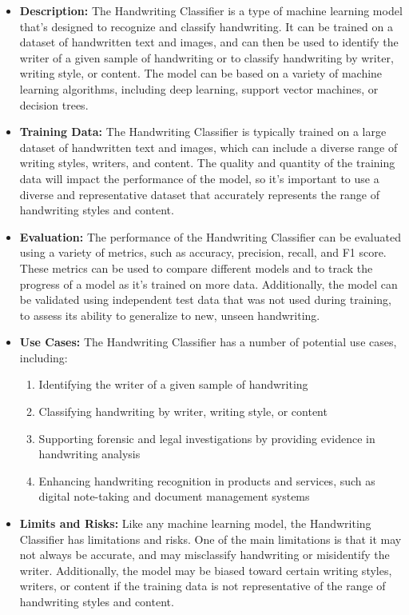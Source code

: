 \begin{itemize}
    \item \textbf{Description:} The Handwriting Classifier is a type of machine learning model that's designed to recognize and classify handwriting. It can be trained on a dataset of handwritten text and images, and can then be used to identify the writer of a given sample of handwriting or to classify handwriting by writer, writing style, or content. The model can be based on a variety of machine learning algorithms, including deep learning, support vector machines, or decision trees.
    \item \textbf{Training Data:} The Handwriting Classifier is typically trained on a large dataset of handwritten text and images, which can include a diverse range of writing styles, writers, and content. The quality and quantity of the training data will impact the performance of the model, so it's important to use a diverse and representative dataset that accurately represents the range of handwriting styles and content.
    \item \textbf{Evaluation:} The performance of the Handwriting Classifier can be evaluated using a variety of metrics, such as accuracy, precision, recall, and F1 score. These metrics can be used to compare different models and to track the progress of a model as it's trained on more data. Additionally, the model can be validated using independent test data that was not used during training, to assess its ability to generalize to new, unseen handwriting.
    \item \textbf{Use Cases:} The Handwriting Classifier has a number of potential use cases, including:
        \begin{enumerate}  
            \item Identifying the writer of a given sample of handwriting
            \item Classifying handwriting by writer, writing style, or content
            \item Supporting forensic and legal investigations by providing evidence in handwriting analysis
            \item Enhancing handwriting recognition in products and services, such as digital note-taking and document management systems
        \end{enumerate}
    \item \textbf{Limits and Risks:} Like any machine learning model, the Handwriting Classifier has limitations and risks. One of the main limitations is that it may not always be accurate, and may misclassify handwriting or misidentify the writer. Additionally, the model may be biased toward certain writing styles, writers, or content if the training data is not representative of the range of handwriting styles and content.

\end{itemize}
